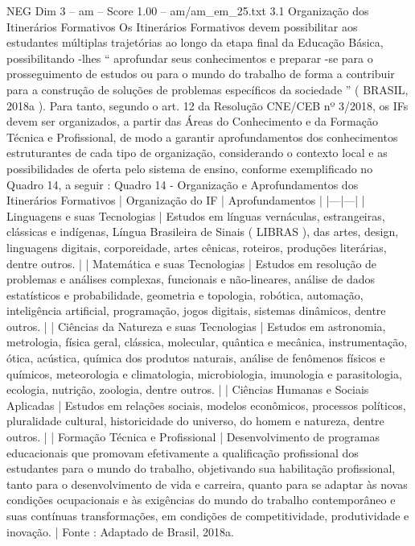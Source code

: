 \begin{textsample}{NEG Dim 3 – am – Score 1.00 – am/am\_em\_25.txt}  \label{ex:f3_neg_255}
3.1 Organização dos Itinerários Formativos Os Itinerários Formativos devem possibilitar aos estudantes múltiplas trajetórias ao longo da etapa final da Educação Básica, possibilitando -lhes “ aprofundar seus conhecimentos e preparar -se para o prosseguimento de estudos ou para o mundo do trabalho de forma a contribuir para a construção de soluções de problemas específicos da sociedade ” ( BRASIL, 2018a ).
Para tanto, segundo o art. 12 da Resolução CNE/CEB nº 3/2018, os IFs devem ser organizados, a partir das Áreas do Conhecimento e da Formação Técnica e Profissional, de modo a garantir aprofundamentos dos conhecimentos estruturantes de cada tipo de organização, considerando o contexto local e as possibilidades de oferta pelo sistema de ensino, conforme exemplificado no Quadro 14, a seguir : Quadro 14 - Organização e Aprofundamentos dos Itinerários Formativos | Organização do IF | Aprofundamentos | |---|---| | Linguagens e suas Tecnologias | Estudos em línguas vernáculas, estrangeiras, clássicas e indígenas, Língua Brasileira de Sinais ( LIBRAS ), das artes, design, linguagens digitais, corporeidade, artes cênicas, roteiros, produções literárias, dentre outros. | | Matemática e suas Tecnologias | Estudos em resolução de problemas e análises complexas, funcionais e não-lineares, análise de dados estatísticos e probabilidade, geometria e topologia, robótica, automação, inteligência artificial, programação, jogos digitais, sistemas dinâmicos, dentre outros. | | Ciências da Natureza e suas Tecnologias | Estudos em astronomia, metrologia, física geral, clássica, molecular, quântica e mecânica, instrumentação, ótica, acústica, química dos produtos naturais, análise de fenômenos físicos e químicos, meteorologia e climatologia, microbiologia, imunologia e parasitologia, ecologia, nutrição, zoologia, dentre outros. | | Ciências Humanas e Sociais Aplicadas | Estudos em relações sociais, modelos econômicos, processos políticos, pluralidade cultural, historicidade do universo, do homem e natureza, dentre outros. | | Formação Técnica e Profissional | Desenvolvimento de programas educacionais que promovam efetivamente a qualificação profissional dos estudantes para o mundo do trabalho, objetivando sua habilitação profissional, tanto para o desenvolvimento de vida e carreira, quanto para se adaptar às novas condições ocupacionais e às exigências do mundo do trabalho contemporâneo e suas contínuas transformações, em condições de competitividade, produtividade e inovação. | Fonte : Adaptado de Brasil, 2018a.

\end{textsample}
